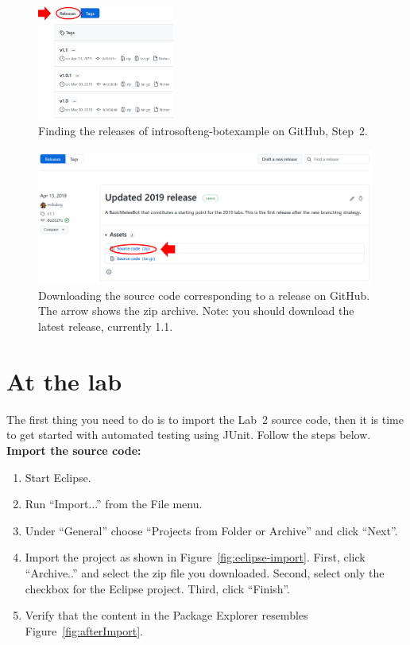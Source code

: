 \documentclass{scrreprt}
\begin{document}
\begin{figure}
\centering
\includegraphics[width=0.4\textwidth]{figures/GitHub-release.png}
\caption{Finding the releases of introsofteng-botexample on GitHub, Step~2.}
\label{fig:github-release}
\end{figure}

\begin{figure}
\centering
\includegraphics[width=0.99\textwidth]{figures/GitHub-zip.png}
\caption{Downloading the source code corresponding to a release on GitHub. The arrow shows the zip archive. Note: you should download the latest release, currently 1.1.}
\label{fig:github-zip}
\end{figure}

\chapter{At the lab}
The first thing you need to do is to import the Lab~2 source code, then it is time to get started with automated testing using JUnit. Follow the steps below.\\

\textbf{Import the source code:}
\begin{enumerate}
\item Start Eclipse.
\item Run ``Import...'' from the File menu.
\item Under ``General'' choose ``Projects from Folder or Archive'' and click ``Next''.
\item Import the project as shown in Figure~\ref{fig:eclipse-import}. First, click ``Archive..'' and select the zip file you downloaded. Second, select only the checkbox for the Eclipse project. Third, click ``Finish''.
\item Verify that the content in the Package Explorer resembles Figure~\ref{fig:afterImport}.
\end{enumerate}
\end{document}
